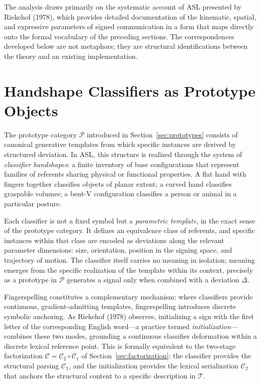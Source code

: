 \documentclass[11pt,a4paper]{article}
\theoremstyle{definition}
\theoremstyle{remark}
\begin{document}
The analysis draws primarily on the systematic account of ASL presented by Riekehof (1978), which provides detailed documentation of the kinematic, spatial, and expressive parameters of signed communication in a form that maps directly onto the formal vocabulary of the preceding sections. The correspondences developed below are not metaphors; they are structural identifications between the theory and an existing implementation.

\section{Handshape Classifiers as Prototype Objects}
\label{sec:asl_classifiers}

The prototype category $\mathcal{P}$ introduced in Section~\ref{sec:prototypes} consists of canonical generative templates from which specific instances are derived by structured deviation. In ASL, this structure is realized through the system of \emph{classifier handshapes}: a finite inventory of base configurations that represent families of referents sharing physical or functional properties. A flat hand with fingers together classifies objects of planar extent; a curved hand classifies graspable volumes; a bent-V configuration classifies a person or animal in a particular posture.

Each classifier is not a fixed symbol but a \emph{parametric template}, in the exact sense of the prototype category. It defines an equivalence class of referents, and specific instances within that class are encoded as deviations along the relevant parameter dimensions: size, orientation, position in the signing space, and trajectory of motion. The classifier itself carries no meaning in isolation; meaning emerges from the specific realization of the template within its context, precisely as a prototype in $\mathcal{P}$ generates a signal only when combined with a deviation $\Delta$.

Fingerspelling constitutes a complementary mechanism: where classifiers provide continuous, gradient-admitting templates, fingerspelling introduces discrete symbolic anchoring. As Riekehof (1978) observes, initializing a sign with the first letter of the corresponding English word---a practice termed \emph{initialization}---combines these two modes, grounding a continuous classifier deformation within a discrete lexical reference point. This is formally equivalent to the two-stage factorization $\mathcal{C} = \mathcal{C}_2 \circ \mathcal{C}_1$ of Section~\ref{sec:factorization}: the classifier provides the structural parsing $\mathcal{C}_1$, and the initialization provides the lexical serialization $\mathcal{C}_2$ that anchors the structural content to a specific description in $\mathcal{T}$.
\end{document}
